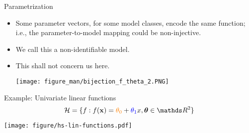 \documentclass[11pt,compress,t,notes=noshow, xcolor=table]{beamer}
\begin{document}
\begin{vbframe}{Parametrization}
\begin{itemize}
 \framebreak
  
  \item Some parameter vectors, for some model classes, encode the same function; i.e., the parameter-to-model mapping could be non-injective. 
    \item We call this a non-identifiable model.
    \item This shall not concern us here.

  \begin{center}
      \texttt{[image: figure\_man/bijection\_f\_theta\_2.PNG]} 
  \end{center}

\end{itemize}
\end{vbframe}



\begin{vbframe}{Example: Univariate linear functions}
$$\Hspace = \{f: \fx = \textcolor{orange}{\theta_0} + 
\textcolor{blue}{\theta_1} x, \thetav \in \R^2\}$$

\begin{center}
  \texttt{[image: figure/hs-lin-functions.pdf]}
\end{center}

\end{vbframe}
\end{document}
